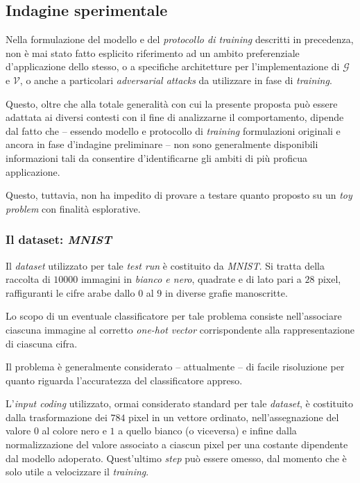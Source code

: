 \documentclass[a4paper, twoside]{article}
\begin{document}
\subsection{Indagine sperimentale}

Nella formulazione del modello e del \textit{protocollo di training} descritti in precedenza, non è mai stato fatto esplicito riferimento ad un ambito preferenziale d'applicazione dello stesso, o a specifiche architetture per l'implementazione di $\mathcal{G}$ e $\mathcal{V}$, o anche a particolari \textit{adversarial attacks} da utilizzare in fase di \textit{training}.

Questo, oltre che alla totale generalità con cui la presente proposta può essere adattata ai diversi contesti con il fine di analizzarne il comportamento, dipende dal fatto che -- essendo modello e protocollo di \textit{training} formulazioni originali e ancora in fase d'indagine preliminare -- non sono generalmente disponibili informazioni tali da consentire d'identificarne gli ambiti di più proficua applicazione.

Questo, tuttavia, non ha impedito di provare a testare quanto proposto su un \textit{toy problem} con finalità esplorative.

\subsubsection{Il dataset: \textit{MNIST}}

Il \textit{dataset} utilizzato per tale \textit{test run} è costituito da \textit{MNIST}. Si tratta della raccolta di $10000$ immagini in \textit{bianco e nero}, quadrate e di lato pari a $28$ pixel, raffiguranti le cifre arabe dallo $0$ al $9$ in diverse grafie manoscritte.

Lo scopo di un eventuale classificatore per tale problema consiste nell'associare ciascuna immagine al corretto \textit{one-hot vector} corrispondente alla rappresentazione di ciascuna cifra.

Il problema è generalmente considerato -- attualmente -- di facile risoluzione per quanto riguarda l'accuratezza del classificatore appreso.

L'\textit{input coding} utilizzato, ormai considerato standard per tale \textit{dataset}, è costituito dalla trasformazione dei $784$ pixel in un vettore ordinato, nell'assegnazione del valore $0$ al colore nero e $1$ a quello bianco (o viceversa) e infine dalla normalizzazione del valore associato a ciascun pixel per una costante dipendente dal modello adoperato. Quest'ultimo \textit{step} può essere omesso, dal momento che è solo utile a velocizzare il \textit{training}.
\end{document}
